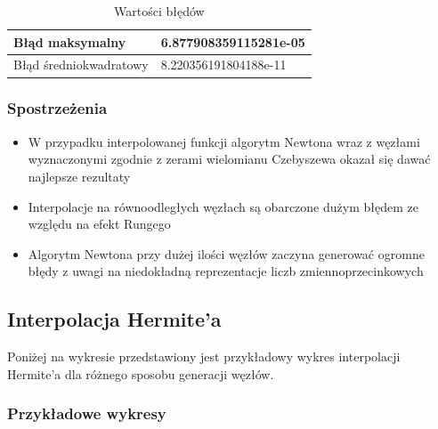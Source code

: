 \documentclass{article}
\begin{document}
\begin{table}[!ht]
    \centering
    \begin{tabular}{|l|l|}
    \hline
        Błąd maksymalny & 6.877908359115281e-05 \\ \hline
        Błąd średniokwadratowy & 8.220356191804188e-11 \\ \hline
    \end{tabular}
    \caption{Wartości błędów}
\end{table}

\subsubsection{Spostrzeżenia}

\begin{itemize}
    \item W przypadku interpolowanej funkcji algorytm Newtona wraz z węzłami wyznaczonymi zgodnie z zerami wielomianu Czebyszewa okazał się dawać najlepsze rezultaty
    \item Interpolacje na równoodległych węzłach są obarczone dużym błędem ze względu na efekt Rungego
    \item Algorytm Newtona przy dużej ilości węzłów zaczyna generować ogromne błędy z uwagi na niedokładną reprezentacje liczb zmiennoprzecinkowych
\end{itemize}

\subsection{Interpolacja Hermite'a}

\noindent
Poniżej na wykresie przedstawiony jest przykładowy wykres interpolacji Hermite'a dla różnego sposobu generacji węzłów.

\subsubsection{Przykładowe wykresy}
\end{document}
